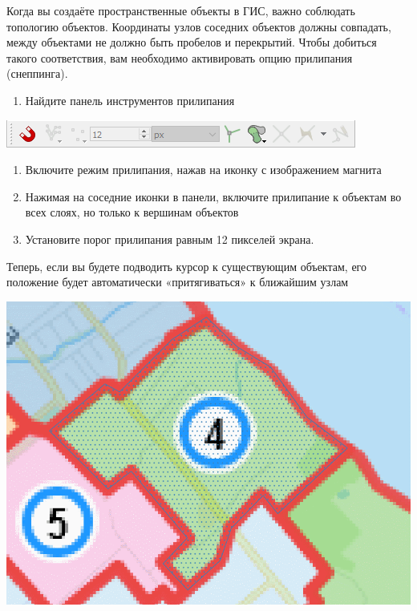 \documentclass[
  12pt,
]{book}
\providecommand{\tightlist}{%
  \setlength{\itemsep}{0pt}\setlength{\parskip}{0pt}}
\begin{document}
Когда вы создаёте пространственные объекты в ГИС, важно соблюдать топологию объектов. Координаты узлов соседних объектов должны совпадать, между объектами не должно быть пробелов и перекрытий. Чтобы добиться такого соответствия, вам необходимо активировать опцию прилипания (снеппинга).

\begin{enumerate}
\def\labelenumi{\arabic{enumi}.}
\setcounter{enumi}{6}
\tightlist
\item
  Найдите панель инструментов прилипания
\end{enumerate}

\includegraphics{images/Ex05_Vectorization/snapping_toolbar.png}

\begin{enumerate}
\def\labelenumi{\arabic{enumi}.}
\setcounter{enumi}{7}
\item
  Включите режим прилипания, нажав на иконку с изображением магнита
\item
  Нажимая на соседние иконки в панели, включите прилипание к объектам во всех слоях, но только к вершинам объектов
\item
  Установите порог прилипания равным 12 пикселей экрана.
\end{enumerate}

Теперь, если вы будете подводить курсор к существующим объектам, его положение будет автоматически «притягиваться» к ближайшим узлам

\includegraphics{images/Ex05_Vectorization/snapping_in_action.gif}
\end{document}
